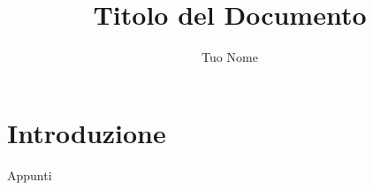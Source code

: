 \documentclass{article}
\title{Titolo del Documento}
\author{Tuo Nome}
\begin{document}
\maketitle
\newpage

\tableofcontents
\newpage

\section{Introduzione}
Appunti 
\end{document}
